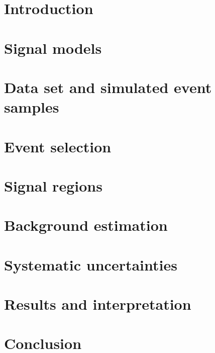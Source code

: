\section{Introduction}
\label{sec:intro}


\section{Signal models}
\label{sec:signals}
\graphicspath{{figures/signals/}}


\section{Data set and simulated event samples}
\label{sec:dataMC}
\graphicspath{{figures/dataMC/}}


\section{Event selection}
\label{sec:selection}
\graphicspath{{figures/sel/}}


\section{Signal regions}
\label{sec:sr}
\graphicspath{{figures/sr/}}


\section{Background estimation}
\label{sec:bkg}
\graphicspath{{figures/bkg/}}


\section{Systematic uncertainties}
\label{sec:syst}
\graphicspath{{figures/syst/}}


\section{Results and interpretation}
\label{sec:res}
\graphicspath{{figures/res/}}


\section{Conclusion}
\label{sec:concl}

